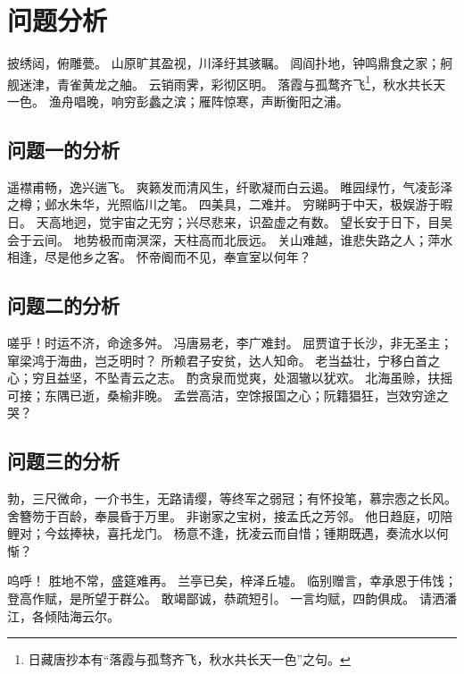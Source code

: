 \section{问题分析}

披绣闼，俯雕甍。
山原旷其盈视，川泽纡其骇瞩。
闾阎扑地，钟鸣鼎食之家；舸舰迷津，青雀黄龙之舳。
云销雨霁，彩彻区明。
落霞与孤鹜齐飞\footnote{日藏唐抄本有“落霞与孤骛齐飞，秋水共长天一色”之句。}，秋水共长天一色。
渔舟唱晚，响穷彭蠡之滨；雁阵惊寒，声断衡阳之浦。

\subsection{问题一的分析}

遥襟甫畅，逸兴遄飞。
爽籁发而清风生，纤歌凝而白云遏。
睢园绿竹，气凌彭泽之樽；邺水朱华，光照临川之笔。
四美具，二难并。
穷睇眄于中天，极娱游于暇日。
天高地迥，觉宇宙之无穷；兴尽悲来，识盈虚之有数。
望长安于日下，目吴会于云间。
地势极而南溟深，天柱高而北辰远。
关山难越，谁悲失路之人；萍水相逢，尽是他乡之客。
怀帝阍而不见，奉宣室以何年？

\subsection{问题二的分析}

嗟乎！时运不济，命途多舛。
冯唐易老，李广难封。
屈贾谊于长沙，非无圣主；窜梁鸿于海曲，岂乏明时？
所赖君子安贫，达人知命。
老当益壮，宁移白首之心；穷且益坚，不坠青云之志。
酌贪泉而觉爽，处涸辙以犹欢。
北海虽赊，扶摇可接；东隅已逝，桑榆非晚。
孟尝高洁，空馀报国之心；阮籍猖狂，岂效穷途之哭？ 

\subsection{问题三的分析}

勃，三尺微命，一介书生，无路请缨，等终军之弱冠；有怀投笔，慕宗悫之长风。
舍簪笏于百龄，奉晨昏于万里。
非谢家之宝树，接孟氏之芳邻。
他日趋庭，叨陪鲤对；今兹捧袂，喜托龙门。
杨意不逢，抚凌云而自惜；锺期既遇，奏流水以何惭？

呜呼！
胜地不常，盛筵难再。
兰亭已矣，梓泽丘墟。
临别赠言，幸承恩于伟饯；登高作赋，是所望于群公。
敢竭鄙诚，恭疏短引。
一言均赋，四韵俱成。
请洒潘江，各倾陆海云尔。